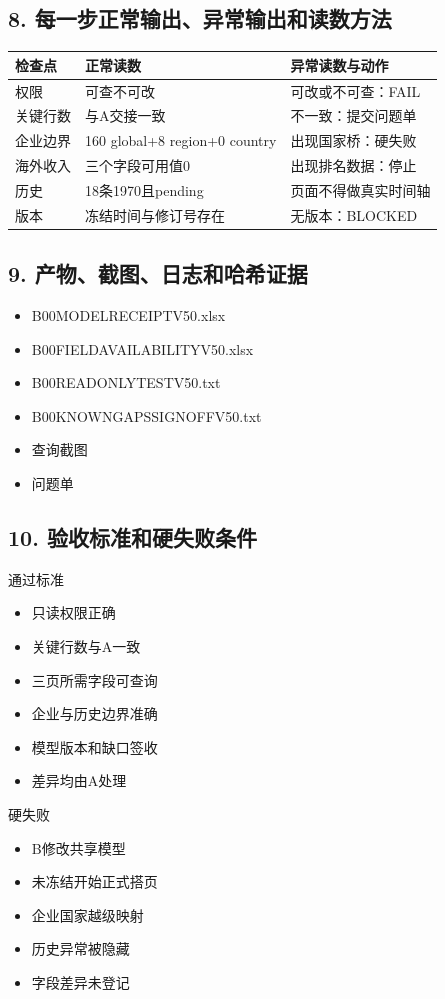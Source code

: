 \documentclass[UTF8,openany,zihao=-4]{ctexbook}
\renewcommand{\_}{\textunderscore\allowbreak}
\begin{document}
\subsection*{8. 每一步正常输出、异常输出和读数方法}
\noindent\begin{tabularx}{\textwidth}{@{}p{}XX@{}}
\toprule
\textbf{检查点} & \textbf{正常读数} & \textbf{异常读数与动作} \\
\midrule
权限 & 可查不可改 & 可改或不可查：FAIL \\
关键行数 & 与A交接一致 & 不一致：提交问题单 \\
企业边界 & 160 global+8 region+0 country & 出现国家桥：硬失败 \\
海外收入 & 三个字段可用值0 & 出现排名数据：停止 \\
历史 & 18条1970且pending & 页面不得做真实时间轴 \\
版本 & 冻结时间与修订号存在 & 无版本：BLOCKED \\
\bottomrule
\end{tabularx}

\subsection*{9. 产物、截图、日志和哈希证据}
\begin{itemize}[label=$\square$]
\item B00\_MODEL\_RECEIPT\_V50.xlsx
\item B00\_FIELD\_AVAILABILITY\_V50.xlsx
\item B00\_READONLY\_TEST\_V50.txt
\item B00\_KNOWN\_GAPS\_SIGNOFF\_V50.txt
\item 查询截图
\item 问题单
\end{itemize}

\subsection*{10. 验收标准和硬失败条件}
\begin{statusbox}{通过标准}
\begin{itemize}[label=$\square$]
\item 只读权限正确
\item 关键行数与A一致
\item 三页所需字段可查询
\item 企业与历史边界准确
\item 模型版本和缺口签收
\item 差异均由A处理
\end{itemize}
\end{statusbox}
\begin{dangerbox}{硬失败}
\begin{itemize}
\item B修改共享模型
\item 未冻结开始正式搭页
\item 企业国家越级映射
\item 历史异常被隐藏
\item 字段差异未登记
\end{itemize}
\end{dangerbox}
\end{document}
